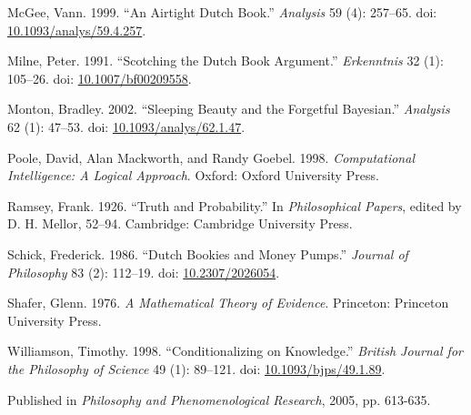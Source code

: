 \documentclass[
  10pt,
  letterpaper,
  DIV=11,
  numbers=noendperiod,
  twoside]{scrartcl}
\newlength{\cslhangindent}
\newenvironment{CSLReferences}[2] %
 {\begin{list}{}{%
  \setlength{\itemindent}{0pt}
  \setlength{\leftmargin}{0pt}
  \setlength{\parsep}{0pt}
  \ifodd #1
   \setlength{\leftmargin}{\cslhangindent}
   \setlength{\itemindent}{-1\cslhangindent}
  \fi
  \setlength{\itemsep}{#2\baselineskip}}}
 {\end{list}}
\begin{document}
\begin{CSLReferences}{1}{0}
McGee, Vann. 1999. {``An Airtight Dutch Book.''} \emph{Analysis} 59 (4):
257--65. doi:
\href{https://doi.org/10.1093/analys/59.4.257}{10.1093/analys/59.4.257}.

Milne, Peter. 1991. {``Scotching the Dutch Book Argument.''}
\emph{Erkenntnis} 32 (1): 105--26. doi:
\href{https://doi.org/10.1007/bf00209558}{10.1007/bf00209558}.

Monton, Bradley. 2002. {``Sleeping Beauty and the Forgetful Bayesian.''}
\emph{Analysis} 62 (1): 47--53. doi:
\href{https://doi.org/10.1093/analys/62.1.47}{10.1093/analys/62.1.47}.

Poole, David, Alan Mackworth, and Randy Goebel. 1998.
\emph{Computational Intelligence: A Logical Approach}. Oxford: Oxford
University Press.

Ramsey, Frank. 1926. {``Truth and Probability.''} In \emph{Philosophical
Papers}, edited by D. H. Mellor, 52--94. Cambridge: Cambridge University
Press.

Schick, Frederick. 1986. {``Dutch Bookies and Money Pumps.''}
\emph{Journal of Philosophy} 83 (2): 112--19. doi:
\href{https://doi.org/10.2307/2026054}{10.2307/2026054}.

Shafer, Glenn. 1976. \emph{A Mathematical Theory of Evidence}.
Princeton: Princeton University Press.

Williamson, Timothy. 1998. {``{Conditionalizing on Knowledge}.''}
\emph{British Journal for the Philosophy of Science} 49 (1): 89--121.
doi: \href{https://doi.org/10.1093/bjps/49.1.89}{10.1093/bjps/49.1.89}.

\end{CSLReferences}



\noindent Published in\emph{
Philosophy and Phenomenological Research}, 2005, pp. 613-635.
\end{document}
